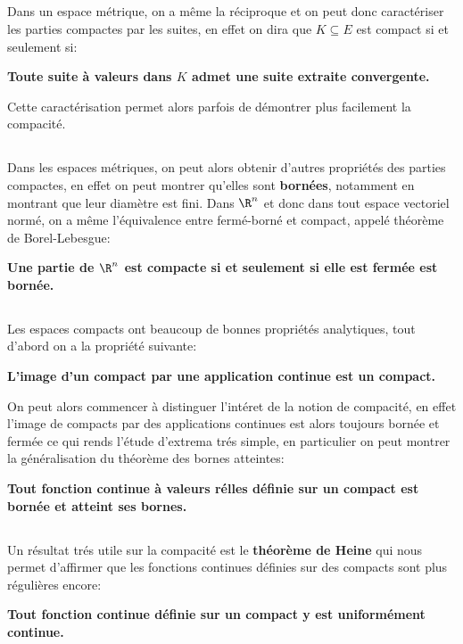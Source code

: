 \subsection*{}
Dans un espace métrique, on a même la réciproque et on peut donc caractériser les parties compactes par les suites, en effet on dira que \(K \subseteq E\) est compact si et seulement si:
\begin{center}
   \textbf{Toute suite à valeurs dans \(K\) admet une suite extraite convergente.}
\end{center}
Cette caractérisation permet alors parfois de démontrer plus facilement la compacité.

\subsection*{}
Dans les espaces métriques, on peut alors obtenir d'autres propriétés des parties compactes, en effet on peut montrer qu'elles sont \textbf{bornées}, notamment en montrant que leur diamètre est fini. Dans \(\R^n\) et donc dans tout espace vectoriel normé, on a même l'équivalence entre fermé-borné et compact, appelé théorème de Borel-Lebesgue:
\begin{center}
   \textbf{Une partie de \(\R^n\) est compacte si et seulement si elle est fermée est bornée.}
\end{center}

\subsection*{}
Les espaces compacts ont beaucoup de bonnes propriétés analytiques, tout d'abord on a la propriété suivante:
\begin{center}
   \textbf{L'image d'un compact par une application continue est un compact.}
\end{center}
On peut alors commencer à distinguer l'intéret de la notion de compacité, en effet l'image de compacts par des applications continues est alors toujours bornée et fermée ce qui rends l'étude d'extrema trés simple, en particulier on peut montrer la généralisation du théorème des bornes atteintes:
\begin{center}
   \textbf{Tout fonction continue à valeurs rélles définie sur un compact est bornée et atteint ses bornes.}
\end{center}
\subsection*{}
Un résultat trés utile sur la compacité est le \textbf{théorème de Heine} qui nous permet d'affirmer que les fonctions continues définies sur des compacts sont plus régulières encore:
\begin{center}
   \textbf{Tout fonction continue définie sur un compact y est uniformément continue.}
\end{center}

